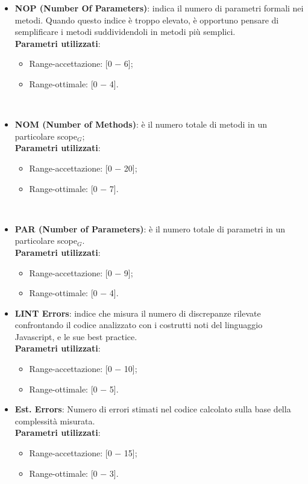 \begin{itemize}
		\item \textbf{NOP (Number Of Parameters)}: indica il numero di parametri formali nei metodi. Quando questo indice è troppo elevato, è opportuno pensare di semplificare i metodi suddividendoli in metodi più semplici. \\
		
		\textbf{Parametri utilizzati}:
		\begin{itemize}
			\item Range-accettazione: [0 − 6];
			\item Range-ottimale: [0 − 4].
		\end{itemize} \\ \bigskip

		\item \textbf{NOM (Number of Methods)}: è il numero totale di metodi in un particolare scope$_G$; \\
		
		\textbf{Parametri utilizzati}:
		\begin{itemize}
			\item Range-accettazione: [0 − 20];
			\item Range-ottimale: [0 − 7].
		\end{itemize} \\ \bigskip

		\item \textbf{PAR (Number of Parameters)}: è il numero totale di parametri in un particolare scope$_G$. \\
		
		\textbf{Parametri utilizzati}:
		\begin{itemize}
			\item Range-accettazione: [0 − 9];
			\item Range-ottimale: [0 − 4].
		\end{itemize}
		
		\item \textbf{LINT Errors}:  indice che misura il numero di discrepanze rilevate confrontando il codice analizzato con i costrutti noti del linguaggio Javascript, e le sue best practice.\\
		
		\textbf{Parametri utilizzati}:
		\begin{itemize}
			\item Range-accettazione: [0 − 10];
			\item Range-ottimale: [0 − 5].
		\end{itemize}
		
		\item \textbf{Est. Errors}:  Numero di errori stimati nel codice calcolato sulla base della complessità misurata.\\
		
		\textbf{Parametri utilizzati}:
		\begin{itemize}
			\item Range-accettazione: [0 − 15];
			\item Range-ottimale: [0 − 3].
		\end{itemize}
	\end{itemize}

